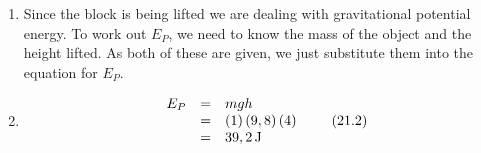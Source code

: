 {\begin{mdframed}[linewidth=4, leftmargin=40, rightmargin=40]
\begin{exercise}
\begin{enumerate}[noitemsep, label=\textbf{Step} \textbf{\arabic*}. ]
\begin{itemize}[noitemsep]
\end{itemize}
      \item  
      \label{m38784*id66437}Since the block is being lifted we are dealing with gravitational potential energy. To work out ${E}_{P}$, we need to know the mass of the object and the height lifted. As both of these are given, we just substitute them into the equation for ${E}_{P}$.\par 
      \item  
      \label{m38784*id66471}\nopagebreak\noindent{}
    \begin{equation}
    \begin{array}{ccc}\hfill {E}_{P}& =& mgh\hfill \\ & =& \left(1\right)\left(9,8\right)\left(4\right)\hfill \\ & =& 39,2\phantom{\rule{0.166667em}{0ex}}\mathrm{J}\hfill \end{array}\tag{21.2}
      \end{equation}
      \end{enumerate}
    \end{exercise}
    \end{mdframed}
    }
    \noindent
\label{m38784*secfhsst!!!underscore!!!id1025}
